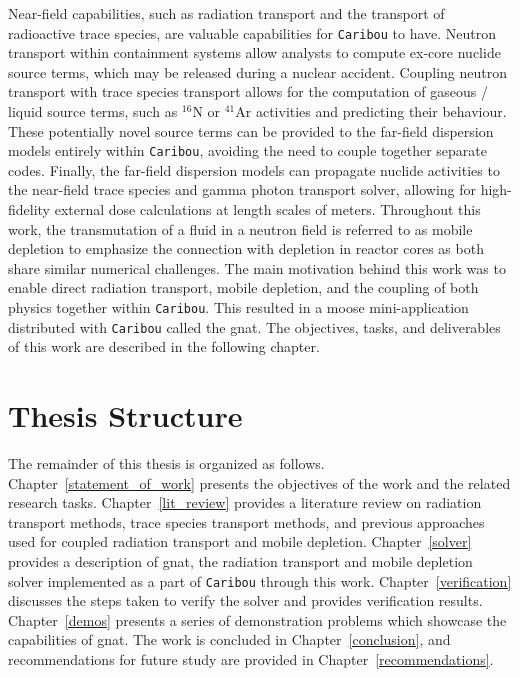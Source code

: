 Near-field capabilities, such as radiation transport and the transport of radioactive trace species, are valuable capabilities for \texttt{Caribou} to have. Neutron transport within containment systems allow analysts to compute ex-core nuclide source terms, which may be released during a nuclear accident. Coupling neutron transport with trace species transport allows for the computation of gaseous / liquid source terms, such as $\mathrm{^{16}N}$ or $\mathrm{^{41}Ar}$ activities and predicting their behaviour. These potentially novel source terms can be provided to the far-field dispersion models entirely within \texttt{Caribou}, avoiding the need to couple together separate codes. Finally, the far-field dispersion models can propagate nuclide activities to the near-field trace species and gamma photon transport solver, allowing for high-fidelity external dose calculations at length scales of meters. Throughout this work, the transmutation of a fluid in a neutron field is referred to as mobile depletion to emphasize the connection with depletion in reactor cores as both share similar numerical challenges. The main motivation behind this work was to enable direct radiation transport, mobile depletion, and the coupling of both physics together within \texttt{Caribou}. This resulted in a \acrshort{moose} mini-application distributed with \texttt{Caribou} called the \acrfull{gnat}. The objectives, tasks, and deliverables of this work are described in the following chapter.

\section{Thesis Structure}
\label{introduction:ms:structure}

The remainder of this thesis is organized as follows. Chapter~\ref{statement_of_work} presents the objectives of the work and the related research tasks. Chapter~\ref{lit_review} provides a literature review on radiation transport methods, trace species transport methods, and previous approaches used for coupled radiation transport and mobile depletion. Chapter~\ref{solver} provides a description of \acrshort{gnat}, the radiation transport and mobile depletion solver implemented as a part of \texttt{Caribou} through this work. Chapter~\ref{verification} discusses the steps taken to verify the solver and provides verification results. Chapter~\ref{demos} presents a series of demonstration problems which showcase the capabilities of \acrshort{gnat}. The work is concluded in Chapter~\ref{conclusion}, and recommendations for future study are provided in Chapter~\ref{recommendations}.